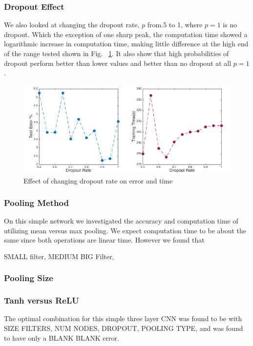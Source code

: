 \documentclass[12pt, twocolumn]{article}
\begin{document}
\subsubsection{Dropout Effect}
We also looked at changing the dropout rate, $p$ from.5 to 1, where $p=1$ is no dropout. Which the exception of one sharp peak, the computation time showed a logarithmic increase in computation time, making little difference at the high end of the range tested shown in Fig. ~\ref{fig:dropoutres}. It also show that high probabilities of dropout perform better than lower values and better than no dropout at all $p=1$. 
\begin{figure}
\includegraphics[scale=.35]{dropoutrate.png}
\caption{Effect of changing dropout rate on error and time}
\label{fig:dropoutres}
\end{figure}


\subsubsection{Pooling Method}
On this simple network we investigated the accuracy and computation time of utilizing mean versus max pooling. We expect computation time to be about the same since both operations are linear time. However we found that 

SMALL filter, MEDIUM BIG Filter,

\subsubsection{Pooling Size}

\subsubsection{Tanh versus ReLU}

The optimal combination for this simple three layer CNN was found to be with SIZE FILTERS, NUM NODES, DROPOUT, POOLING TYPE, and was found to have only a BLANK  BLANK error. 
\end{document}
